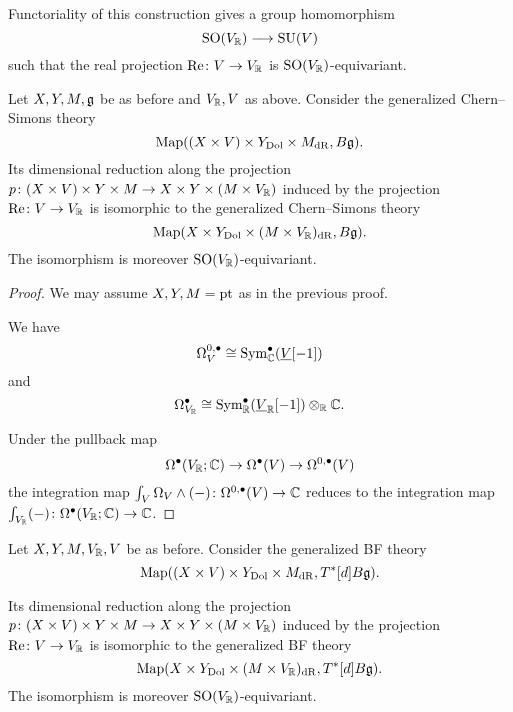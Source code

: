\documentclass[10pt, oneside]{article}
\renewcommand{\Re}{\mathrm{Re}}
\begin{document}
Functoriality of this construction gives a group homomorphism
\begin{equation}
\mathrm{SO}(V_\mathbb R)\longrightarrow \mathrm{SU}(V)
\label{eq:SOtoSU}
\end{equation}
such that the real projection $\Re\colon V\rightarrow V_\RR$ is $\mathrm{SO}(V_\mathbb R)$-equivariant.

\begin{prop} \label{CS_diml_red_prop}
Let $X,Y,M,\mathfrak g$ be as before and $V_\mathbb R, V$ as above. Consider the generalized Chern--Simons theory
\[\operatorname{Map}((X\times V)\times Y_{\mathrm{Dol}}\times M_{\mathrm{dR}}, B\mathfrak g).\]
Its dimensional reduction along the projection $p\colon (X\times V)\times Y\times M\rightarrow X\times Y\times (M\times V_\mathbb R)$ induced by the projection $\Re\colon V\rightarrow V_\RR$ is isomorphic to the generalized Chern--Simons theory
\[\operatorname{Map}(X\times Y_{\mathrm{Dol}}\times (M\times V_\mathbb R)_{\mathrm{dR}}, B\mathfrak g).\]
The isomorphism is moreover $\mathrm{SO}(V_\mathbb R)$-equivariant.
\end{prop}
\begin{proof}
We may assume $X,Y,M=\operatorname{pt}$ as in the previous proof.

We have
\[\Omega^{0, \bullet}_V\cong {\rm Sym}_\mathbb C^\bullet(\underline{V}[-1])\]
and
\[\Omega^\bullet_{V_\mathbb R}\cong {\rm Sym}_\mathbb R^\bullet(\underline{V}_\mathbb R[-1])\otimes_\mathbb R\mathbb C.\]

Under the pullback map
\[\Omega^\bullet(V_\mathbb R; \mathbb C)\rightarrow \Omega^\bullet(V)\rightarrow \Omega^{0, \bullet}(V)\]
the integration map $\int_V \Omega_V\wedge (-)\colon \Omega^{0, \bullet}(V)\rightarrow \mathbb C$ reduces to the integration map $\int_{V_\mathbb R} (-)\colon \Omega^{\bullet}(V_\mathbb R;\mathbb C)\rightarrow \mathbb C$.  
\end{proof}

\begin{corollary}
Let $X, Y, M, V_\mathbb R, V$ be as before. Consider the generalized BF theory
\[\operatorname{Map}((X\times V)\times Y_{\mathrm{Dol}}\times M_{\mathrm{dR}}, T^*[d] B\mathfrak g).\]

Its dimensional reduction along the projection $p\colon (X\times V)\times Y\times M\rightarrow X\times Y\times (M\times V_\mathbb R)$ induced by the projection $\Re\colon V\rightarrow V_\RR$ is isomorphic to the generalized BF theory
\[\operatorname{Map}(X\times Y_{\mathrm{Dol}}\times (M\times V_\mathbb R)_{\mathrm{dR}}, T^*[d] B\mathfrak g).\]
The isomorphism is moreover $\mathrm{SO}(V_\mathbb R)$-equivariant.
\label{cor:BFholomorphicreduction}
\end{corollary}
\end{document}
